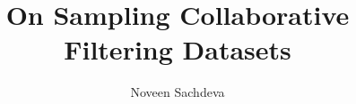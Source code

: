 
\usepackage{titlesec}
\usepackage{caption}
\usepackage{subcaption}
\usepackage{booktabs}
\usepackage{multirow}
\usepackage{multicol}
\usepackage{xspace}
\usepackage{dsfont}
\usepackage{bbm}
\usepackage{bm}
\usepackage{pifont}
\usepackage{amsmath}
\usepackage{amsthm}
\usepackage{mathtools}
\usepackage{stackengine,scalerel}
\usepackage{enumitem}
\usepackage{wrapfig}
\usepackage{caption}
\usepackage{cancel}

\usepackage{hyperref}
\usepackage[capitalise, noabbrev]{cleveref}

\titleformat{\paragraph}[runin]{\bfseries\itshape}{\theparagraph}{1em}{}




\allowdisplaybreaks %


\fancyhead{}

\title{On Sampling Collaborative Filtering Datasets}

\author{Noveen Sachdeva}

